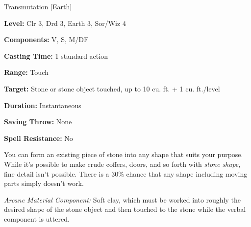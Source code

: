 
Transmutation [Earth]

\textbf{Level:} Clr 3, Drd 3, Earth 3, Sor/Wiz 4

\textbf{Components:} V, S, M/DF

\textbf{Casting Time:} 1 standard action

\textbf{Range:} Touch

\textbf{Target:} Stone or stone object touched, up to 10 cu. ft. + 1 cu. ft./level

\textbf{Duration:} Instantaneous

\textbf{Saving Throw:} None

\textbf{Spell Resistance:} No

You can form an existing piece of stone into any shape that suits your purpose. 
While it's possible to make crude coffers, doors, and so forth with \textit{stone 
shape}, fine detail isn't possible. There is a 30\% chance that any shape including 
moving parts simply doesn't work.

\textit{Arcane Material Component:} Soft clay, which must be worked into roughly 
the desired shape of the stone object and then touched to the stone while the verbal 
component is uttered.


